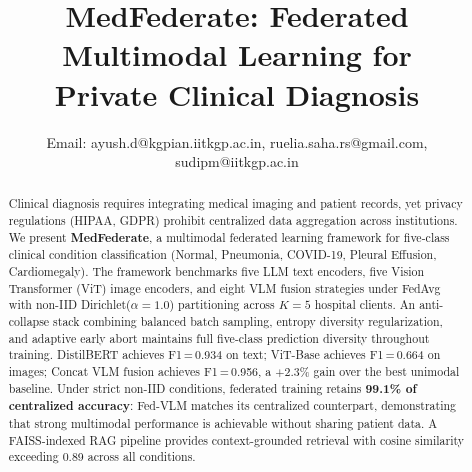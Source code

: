 \documentclass[conference]{IEEEtran}
\begin{document}
\renewcommand{\arraystretch}{0.85}

\renewcommand{\dbltopfraction}{0.9}
\renewcommand{\topfraction}{0.9}

\title{MedFederate: Federated Multimodal Learning for\\
        Private Clinical Diagnosis}

\author{




Email: {ayush.d@kgpian.iitkgp.ac.in,  ruelia.saha.rs@gmail.com, sudipm@iitkgp.ac.in}
}

\maketitle

\begin{abstract}
Clinical diagnosis requires integrating medical imaging and patient
records, yet privacy regulations (HIPAA, GDPR) prohibit centralized
data aggregation across institutions.
We present \textbf{MedFederate}, a multimodal federated learning
framework for five-class clinical condition classification
(Normal, Pneumonia, COVID-19, Pleural Effusion, Cardiomegaly).
The framework benchmarks five LLM text encoders, five Vision Transformer
(ViT) image encoders, and eight VLM fusion strategies under FedAvg
with non-IID Dirichlet($\alpha{=}1.0$) partitioning across $K{=}5$
hospital clients.
An anti-collapse stack combining balanced batch sampling, entropy
diversity regularization, and adaptive early abort maintains full
five-class prediction diversity throughout training.
DistilBERT achieves F1\,=\,0.934 on text; ViT-Base achieves
F1\,=\,0.664 on images; Concat VLM fusion achieves F1\,=\,0.956,
a $+$2.3\% gain over the best unimodal baseline.
Under strict non-IID conditions, federated training retains
\textbf{99.1\% of centralized accuracy}: Fed-VLM matches its
centralized counterpart, demonstrating that strong multimodal
performance is achievable without sharing patient data. A FAISS-indexed RAG pipeline provides context-grounded retrieval with cosine similarity exceeding 0.89 across all conditions.
\end{abstract}
\end{document}
